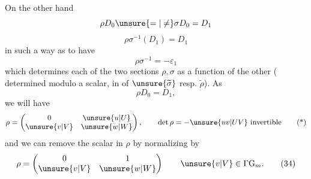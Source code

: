 On the other hand 
\[
\rho D_0\unsure{=|\ne}\sigma D_0=D_1
\]
 
\[
\rho\sigma^{-1}(D_1)=D_1
\]
in such a way as to have
\[
\boxed{\rho\sigma^{-1}=-\varepsilon_1}
\tag{33}
\]
which determines each of the two sections $\rho,\sigma$ as a function of the other
( determined modulo a scalar,
in  
of $\unsure{\widetilde\sigma}$ resp.  $\widetilde\rho$).
As
\[
\rho D_0=D_1,
\]
we will have
\[
\rho=\begin{pmatrix}0&\unsure{u|U}\\\unsure{v|V}&\unsure{w|W}\end{pmatrix},
\qquad \det\rho=-\unsure{uv|UV}\ \text{invertible}
\tag{*}
\]
and we can remove the scalar  in $\rho$
by  normalizing by
\[
\rho=\begin{pmatrix}0&1\\\unsure{v|V}&\unsure{w|W}\end{pmatrix}
\qquad \unsure{v|V}\in\Gamma\mathrm G_m.
\tag{34}
\]

